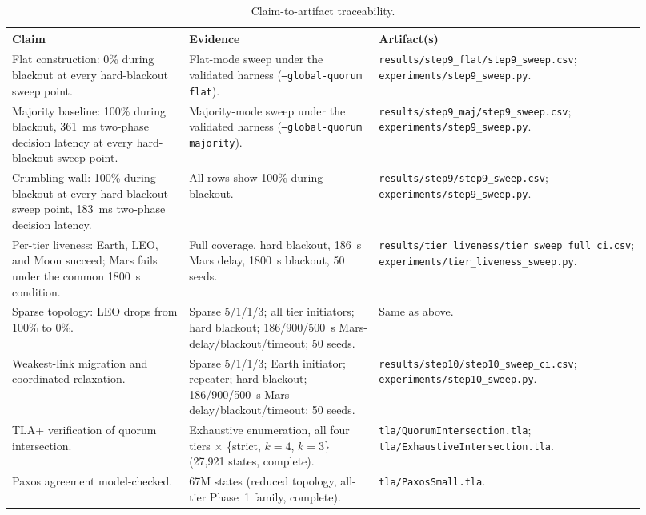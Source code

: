 \documentclass[letterpaper,twocolumn,10pt]{article}
\begin{document}
\begin{table}[t]
\centering
\small
\caption{Claim-to-artifact traceability.}
\label{tab:traceability}
\begin{tabular}{p{0.28\linewidth}p{0.30\linewidth}p{0.34\linewidth}}
\toprule
Claim & Evidence & Artifact(s) \\
\midrule
Flat construction: 0\% during blackout at every hard-blackout sweep point. & Flat-mode sweep under the validated harness (\texttt{--global-quorum flat}). & \texttt{results/step9\_flat/\allowbreak step9\_sweep.csv}; \texttt{experiments/\allowbreak step9\_sweep.py}. \\
Majority baseline: 100\% during blackout, 361~ms two-phase decision latency at every hard-blackout sweep point. & Majority-mode sweep under the validated harness (\texttt{--global-quorum majority}). & \texttt{results/step9\_maj/\allowbreak step9\_sweep.csv}; \texttt{experiments/\allowbreak step9\_sweep.py}. \\
Crumbling wall: 100\% during blackout at every hard-blackout sweep point, 183~ms two-phase decision latency. & All rows show 100\% during-blackout. & \texttt{results/step9/\allowbreak step9\_sweep.csv}; \texttt{experiments/\allowbreak step9\_sweep.py}. \\
Per-tier liveness: Earth, LEO, and Moon succeed; Mars fails under the common 1800~s condition. & Full coverage, hard blackout, 186~s Mars delay, 1800~s blackout, 50 seeds. & \texttt{results/tier\_liveness/\allowbreak tier\_sweep\_full\_ci.csv}; \texttt{experiments/\allowbreak tier\_liveness\_sweep.py}. \\
Sparse topology: LEO drops from 100\% to 0\%. & Sparse 5/1/1/3; all tier initiators; hard blackout; 186/900/500~s Mars-delay/blackout/timeout; 50 seeds. & Same as above. \\
Weakest-link migration and coordinated relaxation. & Sparse 5/1/1/3; Earth initiator; repeater; hard blackout; 186/900/500~s Mars-delay/blackout/timeout; 50 seeds. & \texttt{results/step10/\allowbreak step10\_sweep\_ci.csv}; \texttt{experiments/\allowbreak step10\_sweep.py}. \\
TLA+ verification of quorum intersection. & Exhaustive enumeration, all four tiers $\times$ \{strict, $k{=}4$, $k{=}3$\} (27{,}921 states, complete). & \texttt{tla/\allowbreak QuorumIntersection.tla}; \texttt{tla/\allowbreak ExhaustiveIntersection.tla}. \\
Paxos agreement model-checked. & 67M states (reduced topology, all-tier Phase~1 family, complete). & \texttt{tla/\allowbreak PaxosSmall.tla}. \\
\bottomrule
\end{tabular}
\end{table}
\end{document}
